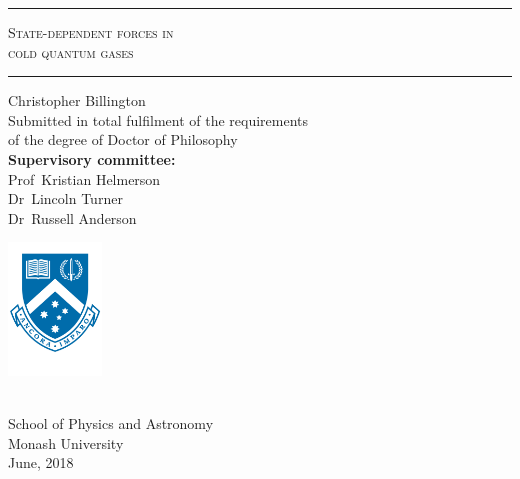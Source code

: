 \begin{titlingpage}
\thispagestyle{empty}
\begin{centering}
\rule{\textwidth}{1pt}\par
\vspace{0.5\baselineskip}
{\HUGE\scshape State-dependent forces in \\ cold quantum gases\\}
\vspace{\baselineskip}
\rule{\textwidth}{1pt}\par
\vfill
{\Huge Christopher Billington}\\
\vfill
\Large Submitted in total fulfilment of the requirements\\
of the degree of Doctor of Philosophy\\
\vspace{\baselineskip}
\textbf{Supervisory committee:}\\
Prof~Kristian Helmerson\\
Dr~Lincoln Turner\\
Dr~Russell Anderson\\
\vfill
\begin{minipage}{3cm}
\centerfloat
\includegraphics[width=2.5cm]{figures/Monash_crest_A4.pdf}
\end{minipage}\\
{\Large School of Physics and Astronomy\\
Monash University\\
\vspace{\baselineskip}
June, 2018}\\
\end{centering}
\restoregeometry
\end{titlingpage}


\cleardoublepage

\vspace*{\fill}

